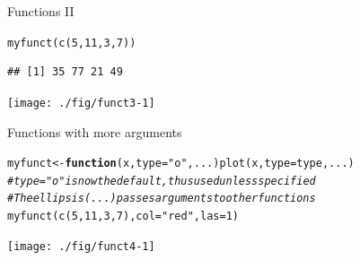\documentclass[xcolor=table,       handout,    xcolor=dvipsnames]{beamer}\usepackage[]{graphicx}\usepackage[]{color}
\makeatletter
\newcommand{\hlnum}[1]{\textcolor[rgb]{0,0,0}{#1}}
\newcommand{\hlstr}[1]{\textcolor[rgb]{0.545,0.137,0.137}{#1}}
\newcommand{\hlcom}[1]{\textcolor[rgb]{0,0.392,0}{\textit{#1}}}
\newcommand{\hlstd}[1]{\textcolor[rgb]{0,0,0}{#1}}
\newcommand{\hlkwa}[1]{\textcolor[rgb]{1,0,0}{\textbf{#1}}}
\newcommand{\hlkwb}[1]{\textcolor[rgb]{0,0,0}{#1}}
\newcommand{\hlkwc}[1]{\textcolor[rgb]{1,0,1}{#1}}
\newcommand{\hlkwd}[1]{\textcolor[rgb]{0,0,1}{#1}}
\newenvironment{kframe}{%
 \def\at@end@of@kframe{}%
 \ifinner\ifhmode%
  \def\at@end@of@kframe{\end{minipage}}%
  \begin{minipage}{\columnwidth}%
 \fi\fi%
 \def\FrameCommand##1{\hskip\@totalleftmargin \hskip-\fboxsep
 \colorbox{shadecolor}{##1}\hskip-\fboxsep
     \hskip-\linewidth \hskip-\@totalleftmargin \hskip\columnwidth}%
 \MakeFramed {\advance\hsize-\width
   \@totalleftmargin\z@ \linewidth\hsize
   \@setminipage}}%
 {\par\unskip\endMakeFramed%
 \at@end@of@kframe}
\newenvironment{knitrout}{}{} %
\makeatother
\begin{document}
\begin{frame}[fragile]{Functions II}
\begin{knitrout}
\color{fgcolor}\begin{kframe}
\begin{alltt}
\hlkwd{myfunct}\hlstd{(}   \hlkwd{c}\hlstd{(}\hlnum{5}\hlstd{,}\hlnum{11}\hlstd{,}\hlnum{3}\hlstd{,}\hlnum{7}\hlstd{)  )}
\end{alltt}
\begin{verbatim}
## [1] 35 77 21 49
\end{verbatim}
\end{kframe}

{\centering \texttt{[image: ./fig/funct3-1]} 

}



\end{knitrout}
\end{frame}


\begin{frame}[fragile]{Functions with more arguments}
\begin{knitrout}\small
{}\color{fgcolor}\begin{kframe}
\begin{alltt}
\hlstd{myfunct} \hlkwb{<-} \hlkwa{function}\hlstd{(}\hlkwc{x}\hlstd{,} \hlkwc{type}\hlstd{=}\hlstr{"o"}\hlstd{,} \hlkwc{...}\hlstd{)} \hlkwd{plot}\hlstd{(x,} \hlkwc{type}\hlstd{=type, ...)}
\hlcom{# type="o" is now the default, thus used unless specified}
\hlcom{# The ellipsis (...) passes arguments to other functions}
\hlkwd{myfunct}\hlstd{(}  \hlkwd{c}\hlstd{(}\hlnum{5}\hlstd{,}\hlnum{11}\hlstd{,}\hlnum{3}\hlstd{,}\hlnum{7}\hlstd{) ,} \hlkwc{col}\hlstd{=}\hlstr{"red"}\hlstd{,} \hlkwc{las}\hlstd{=}\hlnum{1}\hlstd{)}
\end{alltt}
\end{kframe}

{\centering \texttt{[image: ./fig/funct4-1]} 

}



\end{knitrout}
\vspace{-2em}
\end{frame}

\end{document}
